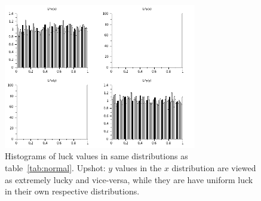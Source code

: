 \begin{figure}
  \caption{Histograms of luck values in same distributions as table~\ref{tab:normal}.  Upshot: $y$ values in the $x$ distribution are viewed as extremely lucky and vice-versa, while they are have uniform luck in their own respective distributions.}
  \centering
    \includegraphics[width=0.75\textwidth]{img/normal}
\end{figure}
